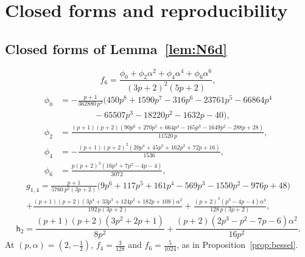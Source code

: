 \section{Closed forms and reproducibility}\label{app:repro}

\subsection*{Closed forms of Lemma~\ref{lem:N6d}}
\begin{equation}\label{eq:f6}
  f_6=\frac{\phi_0+\phi_2\alpha^2+\phi_4\alpha^4+\phi_6\alpha^6}{(3p+2)^2(5p+2)},
\end{equation}
\begin{align*}
  \phi_0&=-\frac{p+1}{362880\,p^2}\bigl(450p^8+1590p^7-316p^6-23761p^5-66864p^4\\
  &\qquad\qquad-65507p^3-18220p^2-1632p-40\bigr),\\
  \phi_2&=\frac{(p+1)(p+2)(90p^6+270p^5+664p^4-165p^3-1649p^2-288p+28)}{11520\,p},\\
  \phi_4&=-\frac{(p+1)(p+2)^2(20p^4+45p^3+162p^2+72p+16)}{1536},\\
  \phi_6&=\frac{p(p+2)^3(16p^3+7p^2-4p-4)}{3072},
\end{align*}
\begin{multline}\label{eq:g14}
  g_{1,4}=\frac{p+1}{5760\,p^2(3p+2)}\bigl(9p^6+117p^5+161p^4-569p^3-1550p^2-976p+48\bigr)\\
  +\frac{(p+1)(p+2)(3p^4+33p^3+124p^2+182p+108)\alpha^2}{192\,p(3p+2)}
  +\frac{(p+2)^3(p^3-4p-4)\alpha^4}{128\,p(3p+2)},
\end{multline}
\begin{equation}\label{eq:h2}
  \mathsf h_2=\frac{(p+1)(p+2)(3p^2+2p+1)}{8p^2}+\frac{(p+2)(2p^3-p^2-7p-6)\alpha^2}{16p^2}.
\end{equation}
At $(p,\alpha)=(2,-\frac12)$, $f_4=\frac3{128}$ and $f_6=\frac5{1024}$, as in Proposition~\ref{prop:bessel}.

